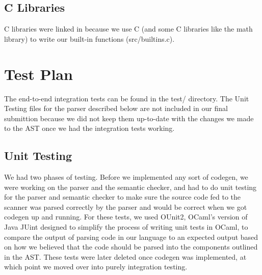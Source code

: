 \documentclass[12pt]{article}
\begin{document}
\subsection{C Libraries}
C libraries were linked in because we use C (and some C libraries like the math library) to write our built-in functions (src/builtins.c).

\section{Test Plan}
The end-to-end integration tests can be found in the test/ directory. The Unit Testing files for the parser described below are not included in our final submittion because we did not keep them up-to-date with the changes we made to the AST once we had the integration tests working.\\

\subsection{Unit Testing}
We had two phases of testing. Before we implemented any sort of codegen, we were working on the parser and the semantic checker, and had to do unit testing for the parser and semantic checker to make sure the source code fed to the scanner was parsed correctly by the parser and would be correct when we got codegen up and running. For these tests, we used OUnit2, OCaml's version of Java JUint designed to simplify the process of writing unit tests in OCaml, to compare the output of parsing code in our language to an expected output based on how we believed that the code should be parsed into the components outlined in the AST. These tests were later deleted once codegen was implemented, at which point we moved over into purely integration testing. \\
\end{document}
